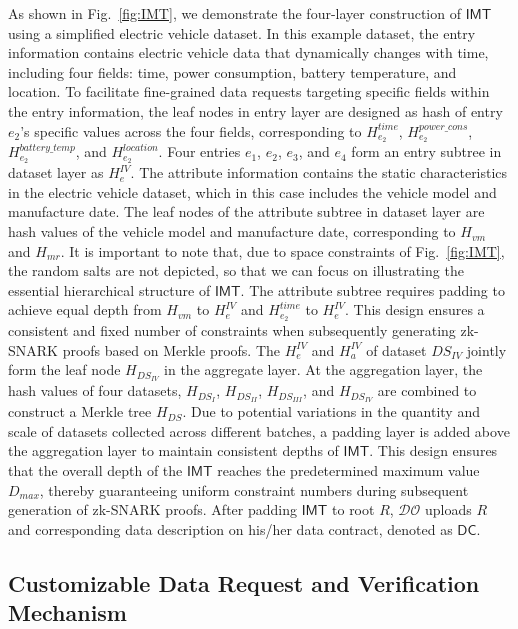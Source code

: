 \documentclass[journal]{IEEEtran}
\begin{document}
As shown in Fig.~\ref{fig:IMT}, we demonstrate the four-layer construction of $\mathsf{IMT}$ using a simplified electric vehicle dataset. In this example dataset, the entry information contains electric vehicle data that dynamically changes with time, including four fields: time, power consumption, battery temperature, and location. To facilitate fine-grained data requests targeting specific fields within the entry information, the leaf nodes in entry layer are designed as hash of entry $e_2$'s specific values across the four fields, corresponding to $H^{time}_{e_2}$, $H^{power\_cons}_{e_2}$, $H^{battery\_temp}_{e_2}$, and $H^{location}_{e_2}$. Four entries $e_1$, $e_2$, $e_3$, and $e_4$ form an entry subtree in dataset layer as $H^{IV}_e$. 
The attribute information contains the static characteristics in the electric vehicle dataset, which in this case includes the vehicle model and manufacture date. The leaf nodes of the attribute subtree in dataset layer are hash values of the vehicle model and manufacture date, corresponding to $H_{vm}$ and $H_{mr}$. It is important to note that, due to space constraints of Fig.~\ref{fig:IMT}, the random salts are not depicted, so that we can focus on illustrating the essential hierarchical structure of $\mathsf{IMT}$.
The attribute subtree requires padding to achieve equal depth from $H_{vm}$ to $H^{IV}_e$ and $H^{time}_{e_2}$ to $H^{IV}_e$. This design ensures a consistent and fixed number of constraints when subsequently generating zk-SNARK proofs based on Merkle proofs. The $H^{IV}_e$ and $H^{IV}_a$ of dataset $DS_{IV}$ jointly form the leaf node $H_{DS_{IV}}$ in the aggregate layer. 
At the aggregation layer, the hash values of four datasets, $H_{DS_{I}}$, $H_{DS_{II}}$, $H_{DS_{III}}$, and $H_{DS_{IV}}$ are combined to construct a Merkle tree $H_{DS}$. Due to potential variations in the quantity and scale of datasets collected across different batches, a padding layer is added above the aggregation layer to maintain consistent depths of $\mathsf{IMT}$. This design ensures that the overall depth of the $\mathsf{IMT}$ reaches the predetermined maximum value $D_{max}$, thereby guaranteeing uniform constraint numbers during subsequent generation of zk-SNARK proofs. After padding $\mathsf{IMT}$ to root $R$, $\mathcal{DO}$ uploads $R$ and corresponding data description on his/her data contract, denoted as $\mathsf{DC}$.

\subsection{Customizable Data Request and Verification Mechanism}
\end{document}
